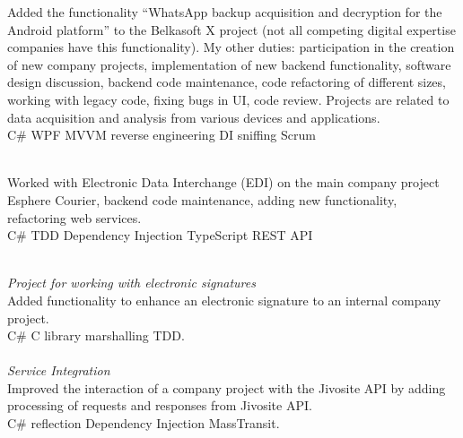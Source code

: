 \documentclass[
	a4paper,
]{fortysecondscv}
\begin{document}
\par
\makefrontsidebar{}

\begin{cvtable}[1.5]
    {
    Added the functionality “WhatsApp backup acquisition and decryption for the Android platform” to the Belkasoft X project (not all competing digital expertise companies have this functionality). My other duties: participation in the creation of new company projects, implementation of new backend functionality, software design discussion, backend code maintenance, code refactoring of different sizes, working with legacy code, fixing bugs in UI, code review. Projects are related to data acquisition and analysis from various devices and applications.
    \\ \colorbox{cvsidecolor}{C\#}
    \colorbox{cvsidecolor}{WPF}
    \colorbox{cvsidecolor}{MVVM}
    \colorbox{cvsidecolor}{reverse engineering}
    \colorbox{cvsidecolor}{DI}
    \colorbox{cvsidecolor}{sniffing}
    \colorbox{cvsidecolor}{Scrum}
    }
    
    {\\
     Worked with Electronic Data Interchange (\colorbox{cvsidecolor}{EDI}) on the main company project Esphere Courier, backend code maintenance, adding new functionality, refactoring web services.
     \\ \colorbox{cvsidecolor}{C\#}
     \colorbox{cvsidecolor}{TDD}
     \colorbox{cvsidecolor}{Dependency Injection}
     \colorbox{cvsidecolor}{TypeScript}
     \colorbox{cvsidecolor}{REST API}
    }

\end{cvtable}

\begin{cvtable}[1.5]

	{\\ \emph{Project for working with electronic signatures} \\
    Added functionality to enhance an electronic signature to an internal company project.
    \\ \colorbox{cvsidecolor}{C\#} 
    \colorbox{cvsidecolor}{C library} \colorbox{cvsidecolor}{marshalling}
    \colorbox{cvsidecolor}{TDD}. \\ \\
     \emph{Service Integration} \\
     Improved the interaction of a company project with the Jivosite API by adding processing of requests and responses from Jivosite API. 
     \\ \colorbox{cvsidecolor}{C\#} 
     \colorbox{cvsidecolor}{reflection} \colorbox{cvsidecolor}{Dependency Injection} \colorbox{cvsidecolor}{MassTransit}.
    }

\end{cvtable}
\end{document}
